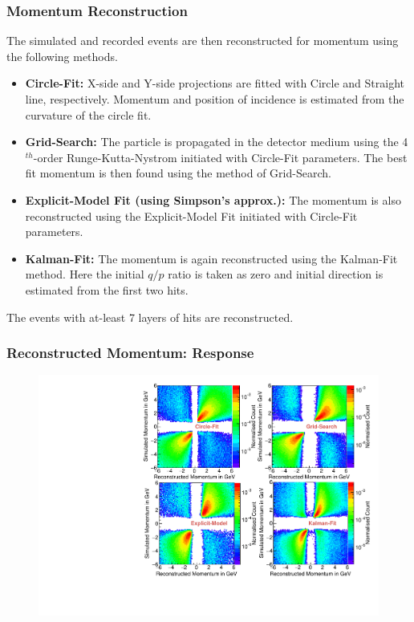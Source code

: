 \documentclass{beamer}
\begin{document}
\begin{frame}%
  \frametitle{Momentum Reconstruction}
  The simulated and recorded events are then reconstructed
  for momentum using the following methods.
  \begin{itemize} %
  \item {\bf Circle-Fit:} X-side and Y-side projections are fitted with
    Circle and Straight line, respectively. Momentum and position of
    incidence is estimated from the curvature of the circle fit.
  \item {\bf Grid-Search:} The particle is propagated in the detector
    medium using the 4$^{th}$-order Runge-Kutta-Nystrom initiated with
    Circle-Fit parameters. The best fit momentum is then found using
    the method of Grid-Search.
  \item {\bf Explicit-Model Fit (using Simpson's approx.):}
    The momentum is also reconstructed
    using the Explicit-Model Fit initiated with Circle-Fit parameters.
  \item {\bf Kalman-Fit:} The momentum is again reconstructed
    using the Kalman-Fit method. Here the initial $q/p$ ratio is
    taken as zero and initial direction is estimated from the first
    two hits.
  \end{itemize}
  The events with at-least 7 layers of hits are reconstructed.
\end{frame}

\begin{frame}
  \frametitle{Reconstructed Momentum: Response}
  \vspace*{-5pt}
  \begin{figure}[h!]
    \includegraphics[width=0.8\linewidth]{responseMatrix_10Layer_All4.pdf}
  \end{figure}
\end{frame}
\end{document}
